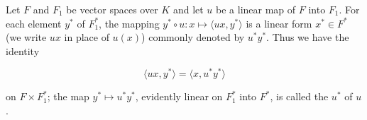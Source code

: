 Let $F$ and $F_1$ be vector spaces over $K$ and let $u$ be a linear map of $F$ into $F_1$. For each element $y^*$ of $F_1^*$, the mapping $y^* \circ u \colon x \mapsto \langle ux, y^* \rangle$ is a linear form $x^* \in F^*$ (we write $ux$ in place of $u(x)$) commonly denoted by $u^*y^*$. Thus we have the identity

$$\langle ux, y^* \rangle = \langle x, u^*y^* \rangle$$

on $F \times F_1^*$; the map $y^* \mapsto u^*y^*$, evidently linear on $F_1^*$ into $F^*$, is called the  $u^*$ of $u$.
